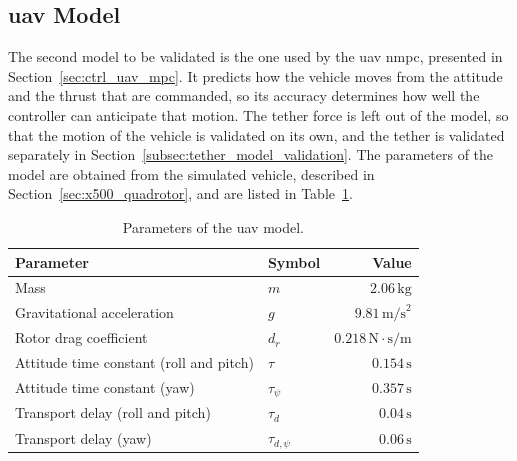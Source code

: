 \subsection{\texorpdfstring{\gls{uav} Model}{UAV Model}}
\label{subsec:uav_validation}

The second model to be validated is the one used by the \gls{uav} \gls{nmpc}, presented in Section~\ref{sec:ctrl_uav_mpc}. It predicts how the vehicle moves from the attitude and the thrust that are commanded, so its accuracy determines how well the controller can anticipate that motion. The tether force is left out of the model, so that the motion of the vehicle is validated on its own, and the tether is validated separately in Section~\ref{subsec:tether_model_validation}. The parameters of the model are obtained from the simulated vehicle, described in Section~\ref{sec:x500_quadrotor}, and are listed in Table~\ref{tab:uav_model_parameters}.

\begin{table}[!htbp]
    \centering
    \caption{Parameters of the \gls{uav} model.}
    \label{tab:uav_model_parameters}
    \begin{tabular}{llr}
        \toprule
        \textbf{Parameter} & \textbf{Symbol} & \textbf{Value} \\
        \midrule
        Mass & $m$ & $2.06\,\text{kg}$ \\
        Gravitational acceleration & $g$ & $9.81\,\text{m/s}^2$ \\
        Rotor drag coefficient & $d_r$ & $0.218\,\text{N}\cdot\text{s}/\text{m}$ \\
        Attitude time constant (roll and pitch) & $\tau$ & $0.154\,\text{s}$ \\
        Attitude time constant (yaw) & $\tau_\psi$ & $0.357\,\text{s}$ \\
        Transport delay (roll and pitch) & $\tau_d$ & $0.04\,\text{s}$ \\
        Transport delay (yaw) & $\tau_{d,\psi}$ & $0.06\,\text{s}$ \\
        \bottomrule
    \end{tabular}
\end{table}

